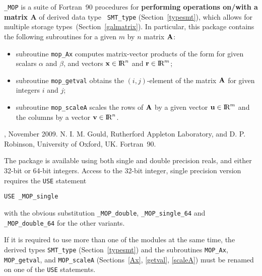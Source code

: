 \documentclass{galahad}
\newcommand{\packagename}{MOP}
\newcommand{\fullpackagename}{\libraryname\_\packagename}
\begin{document}
\galheader


\galsummary

{\tt \fullpackagename} is a suite of Fortran~90 procedures for
{\bf performing operations on/with a matrix $\mathbf{A}$} of derived data type {\tt
  SMT\_type} (Section~\ref{typesmt}), which allows for multiple storage
types~(Section~\ref{galmatrix}).  In particular, this package contains the following
subroutines for a given $m$ by $n$ matrix ${\mathbf{A}}$:
\begin{itemize}
  \item subroutine {\tt mop\_Ax} computes matrix-vector products of
    the form
    for given scalars $\alpha$ and $\beta$, and vectors ${\mathbf{x}}
    \in \hbox{I\hskip -1.5pt R}^n$ and ${\mathbf{r}} \in \hbox{I\hskip -1.5pt R}^m$;
  \item subroutine {\tt mop\_getval} obtains the $(i,j)$-element of
    the matrix ${\mathbf{A}}$ for given integers $i$ and $j$;
  \item subroutine {\tt mop\_scaleA} scales the rows of ${\mathbf{A}}$ by a
    given vector ${\mathbf{u}}\in\hbox{I\hskip -1.5pt R}^m$ and the columns by a vector ${\mathbf{v}}\in\hbox{I\hskip -1.5pt R}^n$.
\end{itemize}


\galattributes
\galversions{\tt  \fullpackagename\_single, \fullpackagename\_double},
\galdate November 2009.
\galorigin N. I. M. Gould, Rutherford Appleton Laboratory, and
D. P. Robinson, University of Oxford, UK.
\gallanguage Fortran~90. 


\galhowto

The package is available using both single and double precision reals, 
and either 32-bit or 64-bit integers. Access to the 32-bit integer,
single precision version requires the {\tt USE} statement
\medskip

\hspace{8mm} {\tt USE \fullpackagename\_single}

\medskip
\noindent
with the obvious substitution {\tt \fullpackagename\_double},
{\tt \fullpackagename\_single\_64} and 
{\tt \fullpackagename\_double\_64} for the other variants.

\noindent
If it is required to use more than one of the modules at the same time, 
the derived types
{\tt SMT\_type} (Section~\ref{typesmt}) 
and the subroutines 
{\tt \packagename\_Ax}, {\tt \packagename\_getval}, and 
{\tt \packagename\_scaleA} (Sections~\ref{Ax}, \ref{getval},
\ref{scaleA}) must be renamed on one of the {\tt USE} statements.
\end{document}
